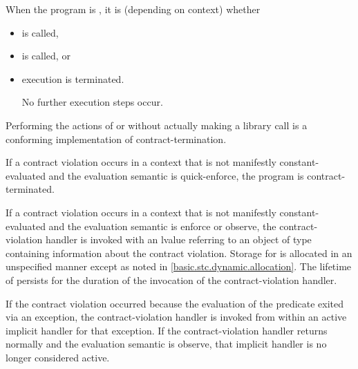 \pnum
When the program is ,
it is
(depending on context) whether
\begin{itemize}
\item
{} is called,
\item
{} is called, or
\item
execution is terminated.

\begin{note}
No further execution steps occur.
\end{note}
\end{itemize}

\begin{note}
Performing the actions of
 or 
without actually making a library call
is a conforming implementation of
contract-termination.
\end{note}

\pnum
{}%
%
If a contract violation occurs
in a context that is not manifestly constant-evaluated
and the evaluation semantic is quick-enforce,
the program is contract-terminated.

\pnum
{}%
%
%
%
If a contract violation occurs
in a context that is not manifestly constant-evaluated
and the evaluation semantic is enforce or observe,
the contract-violation handler
is invoked with an lvalue referring to
an object 
of type 
containing information about the contract violation.
Storage for 
is allocated in an unspecified manner
except as noted in \ref{basic.stc.dynamic.allocation}.
The lifetime of 
persists for the duration
of the invocation of the contract-violation handler.

\pnum
If the contract violation occurred
because the evaluation of the predicate
exited via an exception,
the contract-violation handler is invoked
from within an active implicit handler
for that exception.
If the contract-violation handler
returns normally
and the evaluation semantic is observe,
that implicit handler
is no longer considered active.

